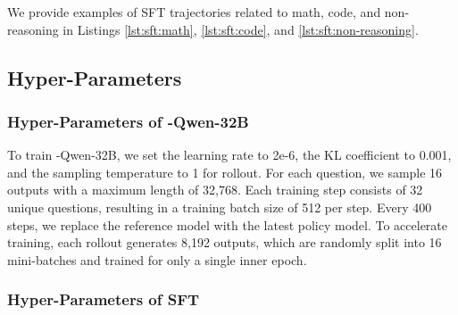 We provide examples of SFT trajectories related to math, code, and non-reasoning in Listings \ref{lst:sft:math}, \ref{lst:sft:code}, and \ref{lst:sft:non-reasoning}.






% 




\subsection{Hyper-Parameters}


\subsubsection{Hyper-Parameters of \dsro{}-Qwen-32B } \label{sec: qwen-zero}
To train \dsro{}-Qwen-32B, we set the learning rate to 2e-6, the KL coefficient to 0.001, and the sampling temperature to 1 for rollout. For each question, we sample 16 outputs with a maximum length of 32,768. Each training step consists of 32 unique questions, resulting in a training batch size of 512 per step. Every 400 steps, we replace the reference model with the latest policy model. To accelerate training, each rollout generates 8,192 outputs, which are randomly split into 16 mini-batches and trained for only a single inner epoch.

\subsubsection{Hyper-Parameters of SFT} \label{sec: r1-1-sft}

